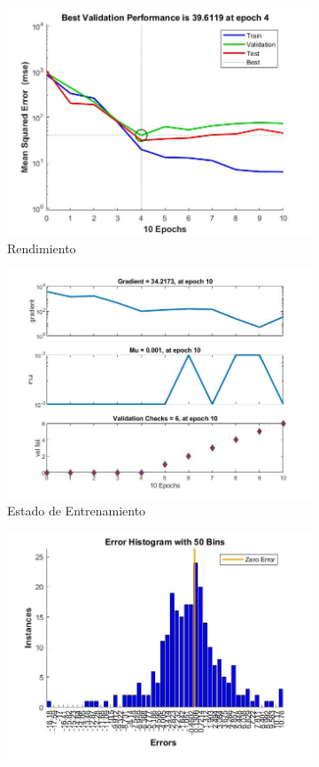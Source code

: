 \documentclass{article}
\begin{document}
\begin{figure}[H]
 \centering
 \begin{subfigure}{0.4\textwidth}
  \includegraphics[width=0.8\linewidth]{../images/I_ex3_performance_bodyfat_dataset_div60-20-20.jpg}
  \caption{Rendimiento}
 \end{subfigure}
 \begin{subfigure}{0.4\textwidth}
  \includegraphics[width=0.8\linewidth]{../images/I_ex3_trainingstate_bodyfat_dataset_div60-20-20.jpg}
  \caption{Estado de Entrenamiento}
 \end{subfigure}
 \begin{subfigure}{0.4\textwidth}
  \includegraphics[width=0.8\linewidth]{../images/I_ex3_errorhistogram_bodyfat_dataset_div60-20-20.jpg}

\end{subfigure}
\end{figure}
\end{document}
